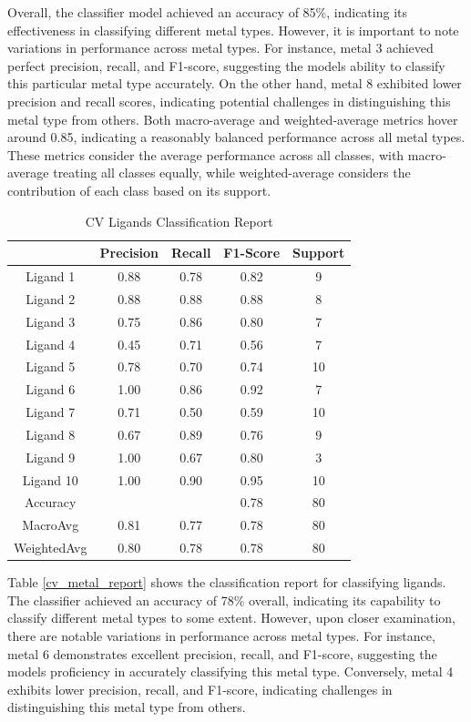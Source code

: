 Overall, the classifier model achieved an accuracy of 85\%, indicating its effectiveness in classifying different metal types. However, it is important to note variations in performance across metal types. For instance, metal 3 achieved perfect precision, recall, and F1-score, suggesting the model\textquotesingle s ability to  classify this particular metal type accurately. On the other hand, metal 8 exhibited lower precision and recall scores, indicating potential challenges in distinguishing this metal type from others.
Both macro-average and weighted-average metrics hover around 0.85, indicating a reasonably balanced performance across all metal types. These metrics consider the average performance across all classes, with macro-average treating all classes equally, while weighted-average considers the contribution of each class based on its support.
\begin{table}[!h]
\begin{center}
\begin{tabular}{c|c|c|c|c}
 & Precision & Recall & F1-Score & Support\\
\hline
Ligand 1 & 0.88 & 0.78 & 0.82 & 9\\
Ligand 2 & 0.88 & 0.88 & 0.88 & 8\\
Ligand 3 & 0.75 & 0.86 & 0.80 & 7\\
Ligand 4 & 0.45 & 0.71 & 0.56 & 7\\
Ligand 5 & 0.78 & 0.70 & 0.74 & 10\\
Ligand 6 & 1.00 & 0.86 & 0.92 & 7\\
Ligand 7 & 0.71 & 0.50 & 0.59 & 10\\
Ligand 8 & 0.67 & 0.89 & 0.76 & 9\\
Ligand 9 & 1.00 & 0.67 & 0.80 & 3\\
Ligand 10 & 1.00 & 0.90 & 0.95 & 10\\
\hline
Accuracy & & & 0.78 & 80\\
MacroAvg & 0.81 & 0.77 & 0.78 & 80\\
WeightedAvg & 0.80 & 0.78 & 0.78 & 80
\end{tabular}
\caption{CV Ligands Classification Report}
\label{cv_ligands_report}
\end{center}
\end{table}
Table \ref{cv_metal_report} shows the classification report for classifying ligands. The classifier achieved an accuracy of 78\% overall, indicating its capability to classify different metal types to some extent. However, upon closer examination, there are notable variations in performance across metal types. For instance, metal 6 demonstrates excellent precision, recall, and F1-score, suggesting the model\textquotesingle s proficiency in accurately classifying this metal type. Conversely, metal 4 exhibits lower precision, recall, and F1-score, indicating challenges in distinguishing this metal type from others.
